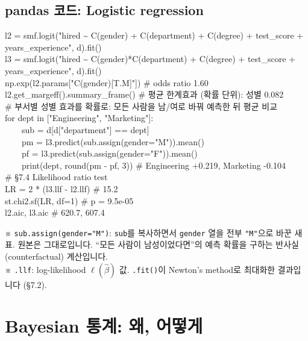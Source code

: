 \documentclass[11pt,a4paper]{article}
\newcommand{\code}[1]{\texttt{#1}}
\newcommand{\aside}[1]{{\footnotesize\color{black!65}#1}}
\begin{document}
\subsection*{pandas 코드: Logistic regression}
\begin{codebox}
l2 = smf.logit("hired \~{} C(gender) + C(department) + C(degree) + test\_score + years\_experience", d).fit()\\
l3 = smf.logit("hired \~{} C(gender)*C(department) + C(degree) + test\_score + years\_experience", d).fit()\\[3pt]
np.exp(l2.params["C(gender)[T.M]"]) \hfill \# odds ratio 1.60\\
l2.get\_margeff().summary\_frame() \hfill \# 평균 한계효과 (확률 단위): 성별 0.082\\[3pt]
\# 부서별 성별 효과를 확률로: 모든 사람을 남/여로 바꿔 예측한 뒤 평균 비교\\
for dept in ["Engineering", "Marketing"]:\\
\ \ \ \ sub = d[d["department"] == dept]\\
\ \ \ \ pm = l3.predict(sub.assign(gender="M")).mean()\\
\ \ \ \ pf = l3.predict(sub.assign(gender="F")).mean()\\
\ \ \ \ print(dept, round(pm - pf, 3)) \hfill \# Engineering +0.219, Marketing -0.104\\[3pt]
\# \S7.4 Likelihood ratio test\\
LR = 2 * (l3.llf - l2.llf) \hfill \# 15.2\\
st.chi2.sf(LR, df=1) \hfill \# p = 9.5e-05\\
l2.aic, l3.aic \hfill \# 620.7, 607.4
\end{codebox}
\aside{※ \code{sub.assign(gender="M")}: \code{sub}를 복사하면서 \code{gender} 열을 전부 \code{"M"}으로 바꾼 새 표. 원본은 그대로입니다. ``모든 사람이 남성이었다면''의 예측 확률을 구하는 반사실(counterfactual) 계산입니다.}\\
\aside{※ \code{.llf}: log-likelihood $\ell(\hat\beta)$ 값. \code{.fit()}이 Newton's method로 최대화한 결과입니다 (\S7.2).}

\section{Bayesian 통계: 왜, 어떻게}
\end{document}
